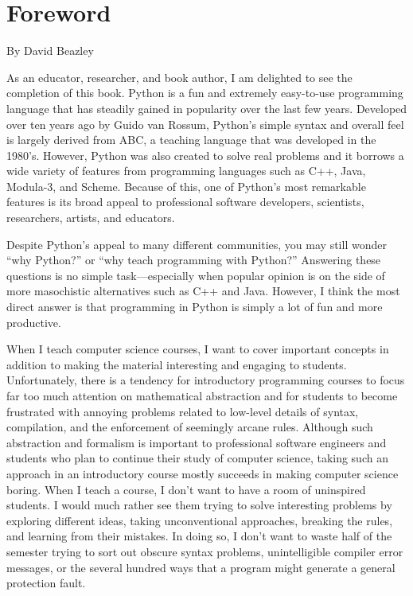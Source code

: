 
\chapter{Foreword}

By David Beazley

As an educator, researcher, and book author, I am delighted to see the
completion of this book.  Python is a fun and extremely easy-to-use
programming language that has steadily gained in popularity over the
last few years.  Developed over ten years ago by Guido van Rossum,
Python's simple syntax and overall feel is largely derived from ABC, a
teaching language that was developed in the 1980's.  However, Python
was also created to solve real problems and it borrows a wide variety
of features from programming languages such as C++, Java, Modula-3,
and Scheme.  Because of this, one of Python's most remarkable features
is its broad appeal to professional software developers, scientists,
researchers, artists, and educators.

Despite Python's appeal to many different communities, you may still
wonder ``why Python?'' or ``why teach programming with Python?''
Answering these questions is no simple task---especially when popular
opinion is on the side of more masochistic alternatives such
as C++ and Java.  However, I think the most direct answer is that
programming in Python is simply a lot of fun and more productive.

When I teach computer science courses, I want to cover important
concepts in addition to making the material interesting and engaging
to students.  Unfortunately, there is a tendency for introductory
programming courses to focus far too much attention on mathematical
abstraction and for students to become frustrated with annoying
problems related to low-level details of syntax, compilation, and the
enforcement of seemingly arcane rules.  Although such abstraction and
formalism is important to professional software engineers and students
who plan to continue their study of computer science, taking such an
approach in an introductory course mostly succeeds in making computer
science boring.  When I teach a course, I don't want to have a room of
uninspired students.  I would much rather see them trying to solve
interesting problems by exploring different ideas, taking
unconventional approaches, breaking the rules, and learning from their
mistakes. In doing so, I don't want to waste half of the semester
trying to sort out obscure syntax problems, unintelligible compiler
error messages, or the several hundred ways that a program might
generate a general protection fault.


